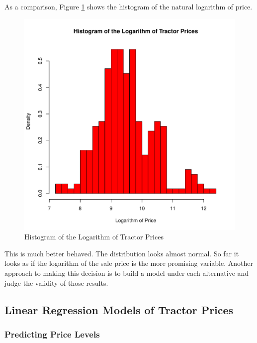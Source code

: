 \documentclass[11pt]{paper}
\begin{document}
\pagebreak
As a comparison, Figure \ref{fig:hist_log_price} shows the histogram of the natural logarithm of
price.

\begin{figure}[h!]
  \centering
  \includegraphics[scale = 0.5, keepaspectratio=true]{../Figures/hist_log_price}
  \caption{Histogram of the Logarithm of Tractor Prices} \label{fig:hist_log_price}
\end{figure}

This is much better behaved. The distribution looks almost normal. 
So far it looks as if the logarithm of the sale price
is the more promising variable.
Another approach to making this decision is
to build a model under each alternative 
and judge the validity of those results.





\pagebreak
\subsection{Linear Regression Models of Tractor Prices}

\subsubsection{Predicting Price Levels}
\end{document}
